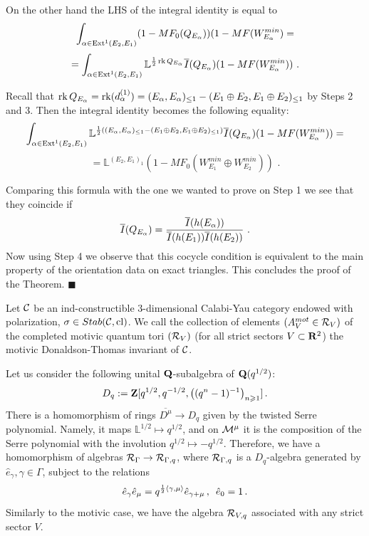 \documentclass[12pt]{article}
\begin{document}
On the other hand the LHS of the integral identity is equal to
$$\int_{\alpha\in \operatorname{Ext}^1(E_2,E_1)}(1-MF_0(Q_{E_{\alpha}}))(1-MF(W^{min}_{E_{\alpha}})=$$
$$=\int_{\alpha\in \operatorname{Ext}^1(E_2,E_1)}{\mathbb L}^{{1\over{2}}\operatorname{rk}Q_{E_{\alpha}}}\overline{I}(Q_{E_{\alpha}})(1-MF(W^{min}_{E_{\alpha}}))\,\,.$$


Recall that $\operatorname{rk} Q_{E_{\alpha}}=\operatorname{rk}(d_{\alpha}^{(1)})=(E_{\alpha},E_{\alpha})_{\le 1}-(E_1\oplus E_2,E_1\oplus E_2)_{\le 1}$ by Steps 2 and 3. Then the integral identity becomes the following equality:
$$\int_{\alpha\in \operatorname{Ext}^1(E_2,E_1)}{\mathbb L}^{{1\over{2}}((E_{\alpha},E_{\alpha})_{\le 1}-(E_1\oplus E_2,E_1\oplus E_2)_{\le 1}) }\overline{I}(Q_{E_{\alpha}})(1-MF(W^{min}_{E_{\alpha}}))=$$
$$={\mathbb L}^{(E_2,E_1)_1}(1-MF_0(W^{min}_{E_1}\oplus W^{min}_{E_2}))\,\,.$$





Comparing this formula with the one we wanted to prove on Step 1 we see that they coincide if
$$\overline{I}(Q_{E_{\alpha}})={{\overline{I}(h(E_{\alpha}))}\over{{\overline{I}(h(E_{1}))}{\overline{I}(h(E_{2}))}}}\,\,.$$
Now using Step 4 we observe that this cocycle condition is equivalent to the main property of the orientation data on exact triangles.
This concludes the proof of the Theorem. $\blacksquare$



\begin{defn} Let ${\mathcal C}$ be an ind-constructible $3$-dimensional Calabi-Yau category endowed with polarization, $\sigma\in Stab({\mathcal C},\operatorname{cl})$. We call the collection of elements $(A_V^{mot}\in {\cal R}_V)$ of the completed motivic quantum tori $({\cal R}_V)$ (for all strict sectors $V\subset {\bf R}^2$) the  motivic Donaldson-Thomas invariant of ${\mathcal C}$.


\end{defn}

Let us consider the following unital ${\bf Q}$-subalgebra of ${\bf Q}(q^{1/2})$:
$$D_q:={\bf Z}[q^{1/2},q^{-1/2},\left((q^n-1)^{-1}\right)_{n\geqslant 1}]\,.$$
 There is a homomorphism of rings $\overline{D^{\mu}}\to D_q$ given by the twisted Serre polynomial. Namely, it maps ${\mathbb L}^{1/2}\mapsto q^{1/2}$, and on
${\cal M}^{\mu}$ it is the composition of the Serre polynomial with the involution $q^{1/2}\mapsto -q^{1/2}$. 
Therefore, we have a homomorphism of algebras ${\cal R}_{\Gamma}\to {\cal R}_{\Gamma,q}$, where
${\cal R}_{\Gamma,q}$ is a $D_q$-algebra
generated by $\hat{e}_{\gamma}, \gamma\in \Gamma$, subject to the relations
$$\hat{e}_{\gamma}\hat{e}_{\mu}=q^{{1\over{2}}{\langle\gamma,\mu\rangle}}\hat{e}_{\gamma+\mu}\,,\,\,\,\hat{e}_0=1\,.$$
Similarly to the motivic case, we have the algebra ${\cal R}_{V,q}$ associated with any strict sector $V$.
\end{document}
